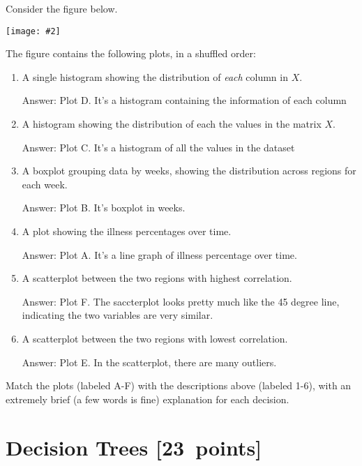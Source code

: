 \documentclass{article}
\newcommand{\blu}[1]{{\textcolor{blu}{#1}}}
\newenvironment{answer}{\par\begingroup\color{gre}Answer: }{\endgroup}
\let\ask\blu
\newcommand\pts[1]{\textcolor{pointscolour}{[#1~points]}}
\newcommand{\centerfig}[2]{\begin{center}\texttt{[image: \#2]}\end{center}}
\begin{document}
  Consider the figure below.

  \centerfig{.9}{./figs/visualize-unlabeled}

  The figure contains the following plots, in a shuffled order:
  \begin{enumerate}
  \item A single histogram showing the distribution of \emph{each} column in $X$.
  \begin{answer}
    Plot D. It's a histogram containing the information of each column
  \end{answer}
  \item A histogram showing the distribution of each the values in the matrix $X$.
  \begin{answer}
    Plot C. It's a histogram of all the values in the dataset
  \end{answer}
  \item A boxplot grouping data by weeks, showing the distribution across regions for each week.
  \begin{answer}
    Plot B. It's boxplot in weeks.
  \end{answer}
  \item A plot showing the illness percentages over time.
  \begin{answer}
    Plot A. It's a line graph of illness percentage over time.
  \end{answer}
  \item A scatterplot between the two regions with highest correlation.
  \begin{answer}
    Plot F. The saccterplot looks pretty much like the 45 degree line, indicating the two variables are very similar.
  \end{answer}
  \item A scatterplot between the two regions with lowest correlation.
  \begin{answer}
    Plot E. In the scatterplot, there are many outliers.
  \end{answer}
  \end{enumerate}

  \ask{Match the plots (labeled A-F) with the descriptions above (labeled 1-6), with an extremely brief (a few words is fine) explanation for each decision.}

  




  \clearpage
  \section{Decision Trees \pts{23}}
\end{document}
